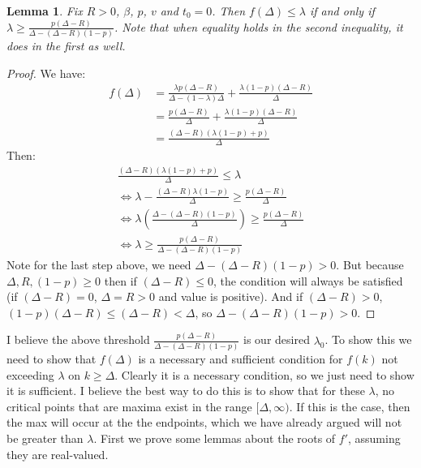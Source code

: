 \documentclass{article}
\newtheorem{lemma}{Lemma}[section]
\begin{document}
\begin{lemma} Fix $R > 0$, $\beta$, $p$, $v$ and $t_0 = 0$. Then $f(\Delta) \leq \lambda$ if and only if $\lambda \geq \frac{p(\Delta-R)}{\Delta-(\Delta-R)(1-p)}$. Note that when equality holds in the second inequality, it does in the first as well. \end{lemma}
\begin{proof}
We have:
\begin{align*}
f(\Delta) &= \frac{\lambda p (\Delta-R)}{\Delta-(1-\lambda)\Delta}+\frac{\lambda (1-p)(\Delta-R)}{\Delta} \\
&= \frac{p(\Delta-R)}{\Delta}+\frac{\lambda(1-p)(\Delta-R)}{\Delta} \\
&= \frac{(\Delta-R)(\lambda(1-p)+p)}{\Delta}
\end{align*}
Then:
\begin{gather*}
\frac{(\Delta-R)(\lambda(1-p)+p)}{\Delta} \leq \lambda \\
\iff \lambda-\frac{(\Delta-R)\lambda(1-p)}{\Delta} \geq \frac{p(\Delta-R)}{\Delta} \\
\iff \lambda \left(\frac{\Delta-(\Delta-R)(1-p)}{\Delta}\right) \geq \frac{p(\Delta-R)}{\Delta} \\
\iff \lambda \geq \frac{p(\Delta-R)}{\Delta-(\Delta-R)(1-p)}
\end{gather*}
Note for the last step above, we need $\Delta-(\Delta-R)(1-p) > 0$. But because $\Delta, R, (1-p) \geq 0$ then if $(\Delta-R) \leq 0$, the condition will always be satisfied (if $(\Delta-R) = 0$, $\Delta = R > 0$ and value is positive). And if $(\Delta-R) > 0$, $(1-p)(\Delta-R) \leq (\Delta-R) < \Delta$, so $\Delta-(\Delta-R)(1-p) > 0$.
\end{proof}

I believe the above threshold $\frac{p(\Delta-R)}{\Delta-(\Delta-R)(1-p)}$ is our desired $\lambda_0$. To show this we need to show that $f(\Delta)$ is a necessary and sufficient condition for $f(k)$ not exceeding $\lambda$ on $k \geq \Delta$. Clearly it is a necessary condition, so we just need to show it is sufficient. I believe the best way to do this is to show that for these $\lambda$, no critical points that are maxima exist in the range $[\Delta, \infty)$. If this is the case, then the max will occur at the the endpoints, which we have already argued will not be greater than $\lambda$. First we prove some lemmas about the roots of $f'$, assuming they are real-valued. \\
\end{document}
